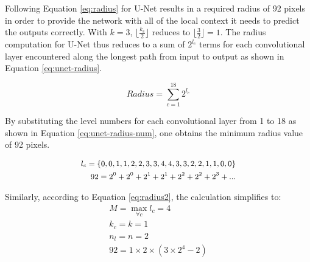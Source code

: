 \documentclass[letterpaper]{article} %
\begin{document}
Following Equation \ref{eq:radius} for U-Net results in a required radius of 92 pixels in order to provide the network with all of the local context it needs to predict the outputs correctly. With $k = 3$, $\lfloor \frac{k_c}{2} \rfloor$ reduces to $\lfloor \frac{3}{2} \rfloor = 1$. The radius computation for U-Net thus reduces to a sum of $2^{l_c}$ terms for each convolutional layer encountered along the longest path from input to output as shown in Equation \ref{eq:unet-radius}. 

\begin{equation}
Radius = \sum_{c=1}^{18} 2^{l_c}
\label{eq:unet-radius}
\end{equation}

By substituting the level numbers for each convolutional layer from 1 to 18 as shown in Equation \ref{eq:unet-radius-num}, one obtains the minimum radius value of 92 pixels. 

\begin{equation}
\begin{small}
\begin{aligned} 
l_c = \{0, 0, 1, 1, 2, 2, 3, 3, 4, 4, 3, 3, 2, 2, 1, 1, 0, 0\} \\
92 = 2^0 + 2^0 + 2^1 + 2^1 + 2^2 + 2^2 + 2^3 + ...
\end{aligned}
\end{small}
\label{eq:unet-radius-num}
\end{equation}

Similarly, according to Equation \ref{eq:radius2}, the calculation simplifies to:
\begin{equation}
\begin{aligned} 
M=\max_{\forall c} { l_c } = 4\\
k_c = k = 1  \\
n_l = n = 2 \\
92 = 1 \times 2 \times (3 \times 2^4 - 2)
\end{aligned}
\label{eq:unet-radius-num2}
\end{equation}
\end{document}
